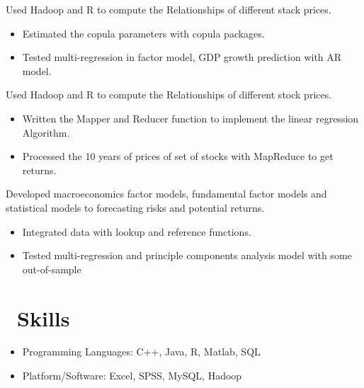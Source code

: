 \documentclass{resume}
\begin{document}
Used Hadoop and R to compute the Relationships of different stack prices.
\begin{itemize}
  \item Estimated the copula parameters with copula packages.
  \item Tested multi-regression in factor model, GDP growth prediction with AR model.
\end{itemize}

Used Hadoop and R to compute the Relationships of different stock prices.
\begin{itemize}
  \item Written the Mapper and Reducer function to implement the linear regression Algorithm.
  \item Processed the 10 years of prices of set of stocks with MapReduce to get returns.
\end{itemize}

Developed macroeconomics factor models, fundamental factor models and statistical models to forecasting risks and potential returns.
\begin{itemize}
  \item Integrated data with lookup and reference functions.
  \item Tested multi-regression and principle components analysis model with some out-of-sample
\end{itemize}

\section{\faCog\ Skills}
\begin{itemize}[parsep=0.5ex]
  \item Programming Languages: C++, Java, R, Matlab, SQL 
  \item Platform/Software: Excel, SPSS, MySQL, Hadoop
\end{itemize}

\end{document}

